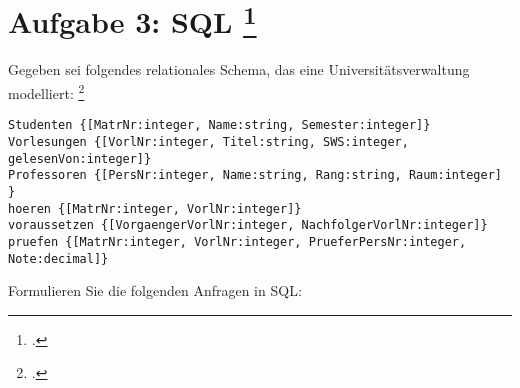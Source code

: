 \documentclass{lehramt-informatik-aufgabe}
\begin{document}

\section{Aufgabe 3: SQL
\footcite[Thema 2 Aufgabe 3]{66113:2003:03}
}

Gegeben sei folgendes relationales Schema, das eine
Universitätsverwaltung modelliert:
\footcite[Aufgabe 3: SQL]{db:pu:2}

\begin{verbatim}
Studenten {[MatrNr:integer, Name:string, Semester:integer]}
Vorlesungen {[VorlNr:integer, Titel:string, SWS:integer, gelesenVon:integer]}
Professoren {[PersNr:integer, Name:string, Rang:string, Raum:integer] }
hoeren {[MatrNr:integer, VorlNr:integer]}
voraussetzen {[VorgaengerVorlNr:integer, NachfolgerVorlNr:integer]}
pruefen {[MatrNr:integer, VorlNr:integer, PrueferPersNr:integer, Note:decimal]}
\end{verbatim}

\noindent
Formulieren Sie die folgenden Anfragen in SQL:
\end{document}

